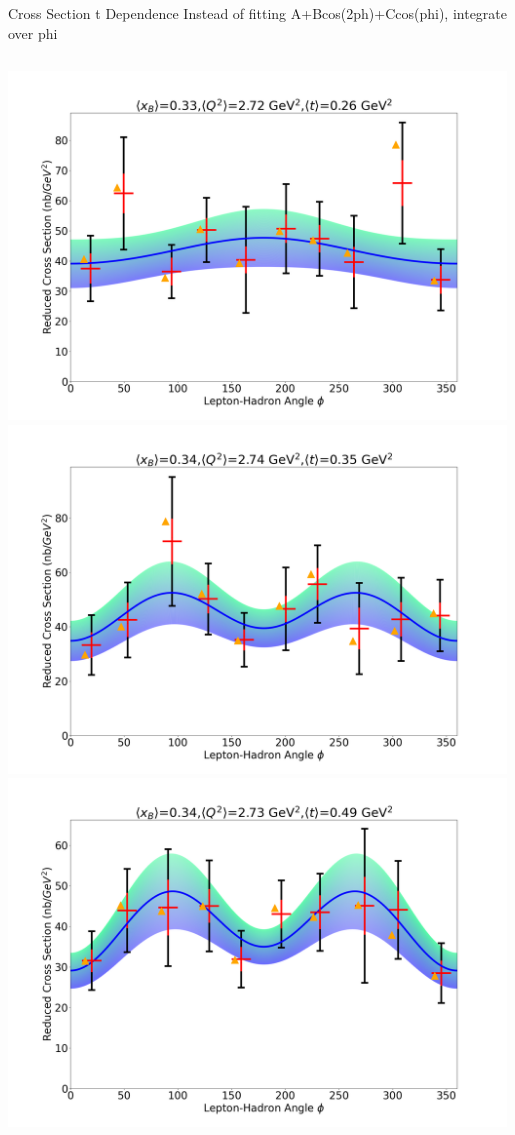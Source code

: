 \documentclass[aspectratio=169]{beamer}
\begin{document}
\begin{frame}{Cross Section t Dependence}
\vspace{-0.2cm}
Instead of fitting A+Bcos(2ph)+Ccos(phi), integrate over phi
\vspace{0.2cm}
\begin{columns}
            \includegraphics[width=0.99\textwidth]{defense/phi_fitting/xqt_302520.png}
            \includegraphics[width=0.99\textwidth]{defense/phi_fitting/xqt_302530.png}
            \includegraphics[width=0.99\textwidth]{defense/phi_fitting/xqt_302540.png}

\end{columns}
\end{frame}
\end{document}
